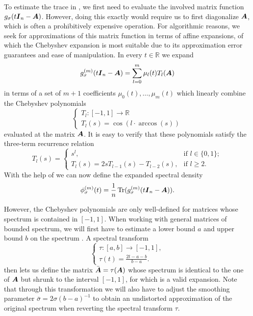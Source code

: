 \documentclass[12pt]{article}
\begin{document}
To estimate the trace in , we first need to evaluate the involved matrix function $g_{\sigma}(t\boldsymbol{I}_n - \boldsymbol{A})$. However, doing this exactly would require us to first diagonalize $\boldsymbol{A}$, which is often a prohibitively expensive operation. For algorithmic reasons, we seek for approximations of this matrix function in terms of affine expansions, of which the Chebyshev expansion is most suitable due to its approximation error guarantees and ease of manipulation. In every $t \in \mathbb{R}$ we expand 
\begin{equation}
    g_{\sigma}^{(m)}(t\boldsymbol{I}_n - \boldsymbol{A}) = \sum_{l=0}^{m} \mu_l(t) T_l(\boldsymbol{A})
    \label{equ:matrix-expansion}
\end{equation}
in terms of a set of $m+1$ coefficients $\mu_0(t), \dots, \mu_m(t)$ which linearly combine the Chebyshev polynomials
\begin{equation}
    \begin{cases}
        T_l : [-1, 1] \to \mathbb{R} \\
        T_l(s) = \cos(l \cdot \arccos(s))
    \end{cases}
    \label{equ:chebyshev-polynomial}
\end{equation}
evaluated at the matrix $\boldsymbol{A}$. It is easy to verify that these polynomials satisfy the three-term recurrence relation
\begin{equation}
    T_l(s) =
    \begin{cases}
        s^l, & \text{if $l \in \{0, 1\}$}; \\
        T_l(s) = 2 s T_{l-1}(s) - T_{l-2}(s), & \text{if $l \geq 2$.}
    \end{cases}
    \label{equ:chebyshev-recurrence}
\end{equation}
With the help of  we can now define the expanded spectral density
\begin{equation}
    \phi_{\sigma}^{(m)}(t) =  \frac{1}{n} \operatorname{Tr}(g_{\sigma}^{(m)}(t \boldsymbol{I}_n - \boldsymbol{A})).
    \label{equ:expanded-spectral-density}
\end{equation}

However, the Chebyshev polynomials are only well-defined for matrices whose spectrum is contained in $[-1, 1]$. When working with general matrices of bounded spectrum, we will first have to estimate a lower bound $a$ and upper bound $b$ on the spectrum \cite{zhou-2011-bounding-spectrum}. A spectral transform
\begin{equation}
    \begin{cases}
        \tau : [a, b] \to [-1, 1],\\
        \tau(t) = \frac{2t - a - b}{b - a}.
    \end{cases}
\end{equation}
then lets us define the matrix $\bar{\boldsymbol{A}} = \tau(\boldsymbol{A})$ whose spectrum is identical to the one of $\boldsymbol{A}$ but shrunk to the interval $[-1, 1]$, for which  is a valid expansion. Note that through this transformation we will also have to adjust the smoothing parameter $\bar{\sigma} = 2 \sigma (b - a)^{-1}$ to obtain an undistorted approximation of the original spectrum when reverting the spectral transform $\tau$.
\end{document}
